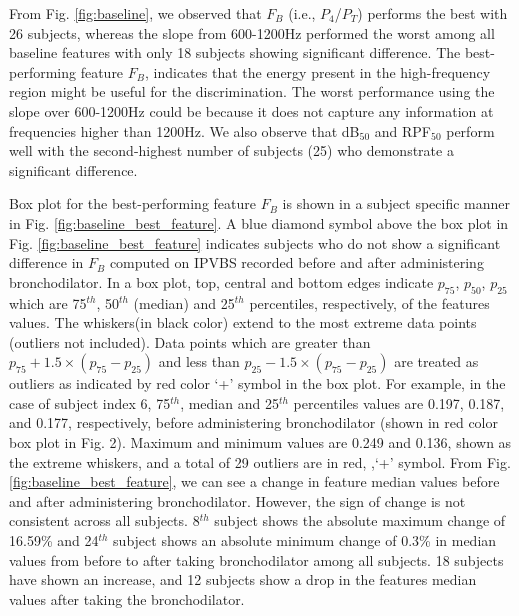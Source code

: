 \documentclass{article}
\begin{document}
From Fig. \ref{fig:baseline}, we observed that $F_B$ (i.e., $P_4$/$P_T$) performs the best with 26 subjects, whereas the slope from 600-1200Hz performed the worst among all baseline features with only 18 subjects showing significant difference. The best-performing feature $F_B$, indicates that the energy present in the high-frequency region might be useful for the discrimination. The worst performance using the slope over 600-1200Hz could be because it does not capture any information at frequencies higher than 1200Hz.
We also observe that dB$_{50}$ and RPF$_{50}$ perform well with the second-highest number of subjects (25) who demonstrate a significant difference.


Box plot for the best-performing feature $F_B$ is shown in a subject specific manner in Fig. \ref{fig:baseline_best_feature}.
A blue diamond symbol above the box plot in Fig. \ref{fig:baseline_best_feature} indicates subjects who do not show a significant difference in $F_B$ computed on IPVBS recorded before and after administering bronchodilator. In a box plot, top, central and bottom edges indicate $p_{75}$, $p_{50}$, $p_{25}$  which are 75$^{th}$, 50$^{th}$ (median) and 25$^{th}$ percentiles, respectively, of the features values. The whiskers(in black color) extend to the most extreme data points (outliers not included). Data points which are greater than $p_{75}+1.5\times (p_{75}-p_{25})$ and less than $p_{25}-1.5\times (p_{75}-p_{25})$ are treated as outliers as indicated by red color `+' symbol in the box plot. For example, in the case of subject index 6, 75$^{th}$, median and 25$^{th}$ percentiles values are 0.197, 0.187, and 0.177, respectively, before administering bronchodilator (shown in red color box plot in Fig. 2). Maximum and minimum values are 0.249 and 0.136, shown as the extreme whiskers, and a total of 29 outliers are in red, ,`+' symbol. From Fig. \ref{fig:baseline_best_feature}, we can see a change in feature median values before and after administering bronchodilator. However, the sign of change is not consistent across all subjects. 8$^{th}$  subject shows the absolute maximum change of 16.59\% and 24$^{th}$ subject shows an absolute minimum change of 0.3\% in median values from before to after taking bronchodilator among all subjects. 18 subjects have shown an increase, and 12 subjects show a drop in the features median values after taking the bronchodilator. 
\end{document}
